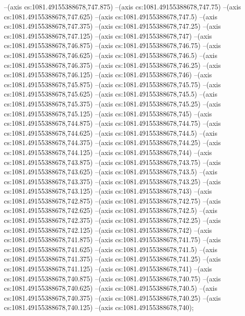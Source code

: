 --(axis cs:1081.49155388678,747.875)
--(axis cs:1081.49155388678,747.75)
--(axis cs:1081.49155388678,747.625)
--(axis cs:1081.49155388678,747.5)
--(axis cs:1081.49155388678,747.375)
--(axis cs:1081.49155388678,747.25)
--(axis cs:1081.49155388678,747.125)
--(axis cs:1081.49155388678,747)
--(axis cs:1081.49155388678,746.875)
--(axis cs:1081.49155388678,746.75)
--(axis cs:1081.49155388678,746.625)
--(axis cs:1081.49155388678,746.5)
--(axis cs:1081.49155388678,746.375)
--(axis cs:1081.49155388678,746.25)
--(axis cs:1081.49155388678,746.125)
--(axis cs:1081.49155388678,746)
--(axis cs:1081.49155388678,745.875)
--(axis cs:1081.49155388678,745.75)
--(axis cs:1081.49155388678,745.625)
--(axis cs:1081.49155388678,745.5)
--(axis cs:1081.49155388678,745.375)
--(axis cs:1081.49155388678,745.25)
--(axis cs:1081.49155388678,745.125)
--(axis cs:1081.49155388678,745)
--(axis cs:1081.49155388678,744.875)
--(axis cs:1081.49155388678,744.75)
--(axis cs:1081.49155388678,744.625)
--(axis cs:1081.49155388678,744.5)
--(axis cs:1081.49155388678,744.375)
--(axis cs:1081.49155388678,744.25)
--(axis cs:1081.49155388678,744.125)
--(axis cs:1081.49155388678,744)
--(axis cs:1081.49155388678,743.875)
--(axis cs:1081.49155388678,743.75)
--(axis cs:1081.49155388678,743.625)
--(axis cs:1081.49155388678,743.5)
--(axis cs:1081.49155388678,743.375)
--(axis cs:1081.49155388678,743.25)
--(axis cs:1081.49155388678,743.125)
--(axis cs:1081.49155388678,743)
--(axis cs:1081.49155388678,742.875)
--(axis cs:1081.49155388678,742.75)
--(axis cs:1081.49155388678,742.625)
--(axis cs:1081.49155388678,742.5)
--(axis cs:1081.49155388678,742.375)
--(axis cs:1081.49155388678,742.25)
--(axis cs:1081.49155388678,742.125)
--(axis cs:1081.49155388678,742)
--(axis cs:1081.49155388678,741.875)
--(axis cs:1081.49155388678,741.75)
--(axis cs:1081.49155388678,741.625)
--(axis cs:1081.49155388678,741.5)
--(axis cs:1081.49155388678,741.375)
--(axis cs:1081.49155388678,741.25)
--(axis cs:1081.49155388678,741.125)
--(axis cs:1081.49155388678,741)
--(axis cs:1081.49155388678,740.875)
--(axis cs:1081.49155388678,740.75)
--(axis cs:1081.49155388678,740.625)
--(axis cs:1081.49155388678,740.5)
--(axis cs:1081.49155388678,740.375)
--(axis cs:1081.49155388678,740.25)
--(axis cs:1081.49155388678,740.125)
--(axis cs:1081.49155388678,740);
